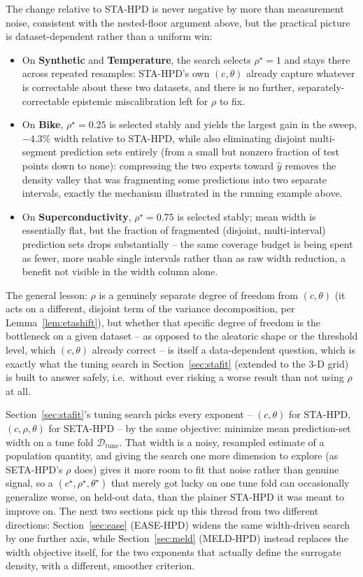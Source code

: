 \documentclass[11pt]{article}
\begin{document}
The change relative to STA-HPD is never negative by more than measurement noise, consistent with
the nested-floor argument above, but the practical picture is dataset-dependent rather than a
uniform win:
\begin{itemize}[leftmargin=1.5em]
\item On \textbf{Synthetic} and \textbf{Temperature}, the search selects $\rho^\star=1$ and stays
there across repeated resamples: STA-HPD's own $(c,\theta)$ already capture whatever is correctable
about these two datasets, and there is no further, separately-correctable epistemic miscalibration
left for $\rho$ to fix.
\item On \textbf{Bike}, $\rho^\star=0.25$ is selected stably and yields the largest gain in the
sweep, $-4.3\%$ width relative to STA-HPD, while also eliminating disjoint multi-segment prediction
sets entirely (from a small but nonzero fraction of test points down to none): compressing the two
experts toward $\hat y$ removes the density valley that was fragmenting some predictions into two
separate intervals, exactly the mechanism illustrated in the running example above.
\item On \textbf{Superconductivity}, $\rho^\star=0.75$ is selected stably; mean width is
essentially flat, but the fraction of fragmented (disjoint, multi-interval) prediction sets drops
substantially -- the same coverage budget is being spent as fewer, more usable single intervals
rather than as raw width reduction, a benefit not visible in the width column alone.
\end{itemize}
The general lesson: $\rho$ is a genuinely separate degree of freedom from $(c,\theta)$ (it acts on
a different, disjoint term of the variance decomposition, per Lemma~\ref{lem:etashift}), but
whether that specific degree of freedom is the bottleneck on a given dataset -- as opposed to the
aleatoric shape or the threshold level, which $(c,\theta)$ already correct -- is itself a
data-dependent question, which is exactly what the tuning search in Section~\ref{sec:stafit}
(extended to the 3-D grid) is built to answer safely, i.e.\ without ever risking a worse result
than not using $\rho$ at all.

Section~\ref{sec:stafit}'s tuning search picks every exponent -- $(c,\theta)$ for STA-HPD,
$(c,\rho,\theta)$ for SETA-HPD -- by the same objective: minimize mean prediction-set width on a
tune fold $\mathcal D_{\mathrm{tune}}$. That width is a noisy, resampled estimate of a population
quantity, and giving the search one more dimension to explore (as SETA-HPD's $\rho$ does) gives it
more room to fit that noise rather than genuine signal, so a $(c^\star,\rho^\star,\theta^\star)$
that merely got lucky on one tune fold can occasionally generalize worse, on held-out data, than
the plainer STA-HPD it was meant to improve on. The next two sections pick up this thread from two
different directions: Section~\ref{sec:ease} (EASE-HPD) widens the same width-driven search by one
further axis, while Section~\ref{sec:meld} (MELD-HPD) instead replaces the width objective itself,
for the two exponents that actually define the surrogate density, with a different, smoother
criterion.
\end{document}
